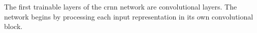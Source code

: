 
The first trainable layers of the \gls{crnn} network are
convolutional layers. The network begins by processing each
input representation in its own convolutional block.
